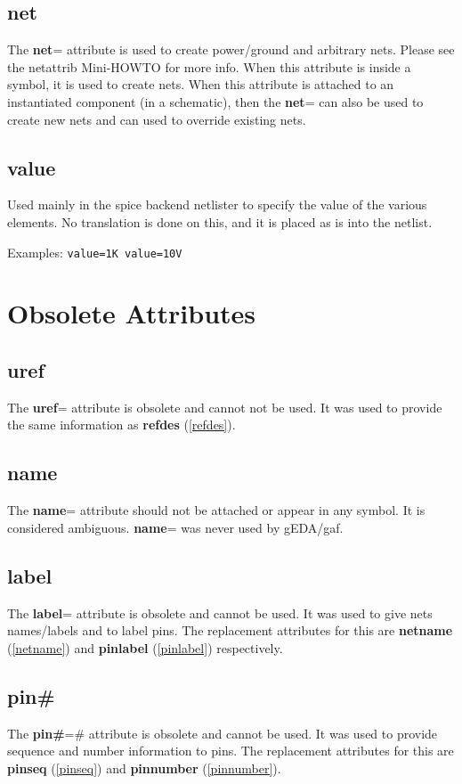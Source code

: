 \documentclass{article}
\begin{document}
\subsection{{\bf net}\label{net}}
The {\bf net}= attribute is used to create power/ground and arbitrary nets.
Please see the netattrib Mini-HOWTO for more info.  When this attribute
is inside a symbol, it is used to create nets.  When this attribute is
attached to an instantiated component (in a schematic), then the
{\bf net}= can also be used to create new nets and can used to override
existing nets.

\subsection{{\bf value}\label{value}}
Used mainly in the spice backend netlister to specify the value of the
various elements.  No translation is done on this, and it is placed as
is into the netlist.

Examples: \texttt{value=1K value=10V}


\section{Obsolete Attributes}

\subsection{{\bf uref}\label{uref}}
The {\bf uref}= attribute is obsolete and cannot not be used.  It was used
to provide the same information as {\bf refdes} (\ref{refdes}).


\subsection{{\bf name}\label{name}}
The {\bf name}= attribute should not be attached or appear in any symbol.
It is considered ambiguous.  {\bf name}= was never used by gEDA/gaf.


\subsection{{\bf label}\label{label}}
The {\bf label}= attribute is obsolete and cannot be used.  It was 
used to give nets names/labels and to label pins.  The replacement
attributes for this are {\bf netname} (\ref{netname}) and 
{\bf pinlabel} (\ref{pinlabel}) respectively.


\subsection{{\bf pin\#}\label{pinPOUND}}
The {\bf pin\#}=\# attribute is obsolete and cannot be used.  It was
used to provide sequence and number information to pins.  The replacement
attributes for this are {\bf pinseq} (\ref{pinseq}) and {\bf pinnumber}
(\ref{pinnumber}).
\end{document}
